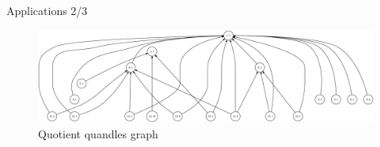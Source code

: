 \begin{frame}{Applications 2/3}
\begin{figure}[H]
    \centering
    \includegraphics[scale = 0.19]{Thesis/images/BigConnectedQuoQuandle.eps}
    \caption{Quotient quandles graph}
    \label{fig:my_label}
\end{figure}
\end{frame}



